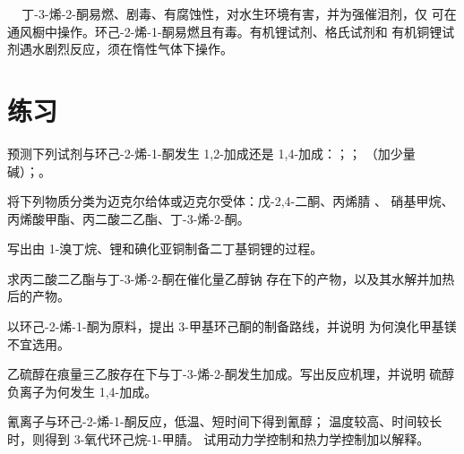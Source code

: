 \begin{safety}{\,\,\,\,\,}
丁-3-烯-2-酮易燃、剧毒、有腐蚀性，对水生环境有害，并为强催泪剂，仅
可在通风橱中操作。环己-2-烯-1-酮易燃且有毒。有机锂试剂、格氏试剂和
有机铜锂试剂遇水剧烈反应，须在惰性气体下操作。
\end{safety}

\section{练习}

\begin{exercise}[$\star$]\label{exo:b2:conjugate-additions:1}
预测下列试剂与环己-2-烯-1-酮发生 1,2-加成还是 1,4-加成：；；
（加少量碱）；。
\end{exercise}

\begin{exercise}[$\star$]\label{exo:b2:conjugate-additions:2}
将下列物质分类为迈克尔给体或迈克尔受体：戊-2,4-二酮、丙烯腈 、
硝基甲烷、丙烯酸甲酯、丙二酸二乙酯、丁-3-烯-2-酮。
\end{exercise}

\begin{exercise}[$\star$]\label{exo:b2:conjugate-additions:3}
写出由 1-溴丁烷、锂和碘化亚铜制备二丁基铜锂的过程。
\end{exercise}

\begin{exercise}[$\star$]\label{exo:b2:conjugate-additions:4}
求丙二酸二乙酯与丁-3-烯-2-酮在催化量乙醇钠
存在下的产物，以及其水解并加热后的产物。
\end{exercise}

\begin{exercise}[$\star\star$]\label{exo:b2:conjugate-additions:5}
以环己-2-烯-1-酮为原料，提出 3-甲基环己酮的制备路线，并说明
为何溴化甲基镁不宜选用。
\end{exercise}

\begin{exercise}[$\star\star$]\label{exo:b2:conjugate-additions:6}
乙硫醇在痕量三乙胺存在下与丁-3-烯-2-酮发生加成。写出反应机理，并说明
硫醇负离子为何发生 1,4-加成。
\end{exercise}

\begin{exercise}[$\star\star$]\label{exo:b2:conjugate-additions:7}
氰离子与环己-2-烯-1-酮反应，低温、短时间下得到氰醇；
温度较高、时间较长时，则得到 3-氧代环己烷-1-甲腈。
试用动力学控制和热力学控制加以解释。
\end{exercise}

